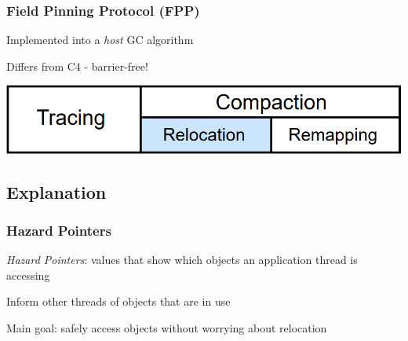 \documentclass{beamer}
\newcommand{\linespace}{\vskip 0.25cm}
\begin{document}
\begin{frame}

\frametitle{Field Pinning Protocol (FPP)}

Implemented into a \emph{host} GC algorithm

\linespace
\linespace

Differs from C4 - barrier-free!

\linespace
\linespace
\linespace

\begin{center}
\includegraphics[width=.85\textwidth]{Illustrations/gc_cycle_locator_relocation.png}
\end{center}

\end{frame}



\subsection*{Explanation}

\begin{frame}

\frametitle{Hazard Pointers}

\emph{Hazard Pointers}: values that show which objects an application thread is accessing

\linespace
\linespace

Inform other threads of objects that are in use

\linespace
\linespace

Main goal: safely access objects without worrying about relocation

\end{frame}
\end{document}
